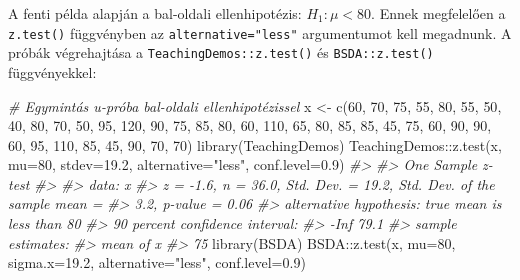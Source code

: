 \documentclass[
]{book}
\newenvironment{Shaded}{\begin{snugshade}}{\end{snugshade}}
\newcommand{\AttributeTok}[1]{\textcolor[rgb]{0.77,0.63,0.00}{#1}}
\newcommand{\CommentTok}[1]{\textcolor[rgb]{0.56,0.35,0.01}{\textit{#1}}}
\newcommand{\DecValTok}[1]{\textcolor[rgb]{0.00,0.00,0.81}{#1}}
\newcommand{\FloatTok}[1]{\textcolor[rgb]{0.00,0.00,0.81}{#1}}
\newcommand{\FunctionTok}[1]{\textcolor[rgb]{0.00,0.00,0.00}{#1}}
\newcommand{\NormalTok}[1]{#1}
\newcommand{\OtherTok}[1]{\textcolor[rgb]{0.56,0.35,0.01}{#1}}
\newcommand{\SpecialCharTok}[1]{\textcolor[rgb]{0.00,0.00,0.00}{#1}}
\newcommand{\StringTok}[1]{\textcolor[rgb]{0.31,0.60,0.02}{#1}}
\begin{document}
A fenti példa alapján a bal-oldali ellenhipotézis: \(H_1:\mu<80\). Ennek megfelelően a \texttt{z.test()} függvényben az \texttt{alternative="less"} argumentumot kell megadnunk. A próbák végrehajtása a \texttt{TeachingDemos::z.test()} és \texttt{BSDA::z.test()} függvényekkel:

\begin{Shaded}
\begin{Highlighting}[]
\CommentTok{\# Egymintás u{-}próba bal{-}oldali ellenhipotézissel}
\NormalTok{x }\OtherTok{\textless{}{-}} \FunctionTok{c}\NormalTok{(}\DecValTok{60}\NormalTok{, }\DecValTok{70}\NormalTok{, }\DecValTok{75}\NormalTok{, }\DecValTok{55}\NormalTok{, }\DecValTok{80}\NormalTok{, }\DecValTok{55}\NormalTok{, }\DecValTok{50}\NormalTok{, }\DecValTok{40}\NormalTok{, }\DecValTok{80}\NormalTok{, }\DecValTok{70}\NormalTok{, }\DecValTok{50}\NormalTok{,}
\DecValTok{95}\NormalTok{, }\DecValTok{120}\NormalTok{, }\DecValTok{90}\NormalTok{, }\DecValTok{75}\NormalTok{, }\DecValTok{85}\NormalTok{, }\DecValTok{80}\NormalTok{, }\DecValTok{60}\NormalTok{, }\DecValTok{110}\NormalTok{, }\DecValTok{65}\NormalTok{, }\DecValTok{80}\NormalTok{, }\DecValTok{85}\NormalTok{, }
\DecValTok{85}\NormalTok{, }\DecValTok{45}\NormalTok{, }\DecValTok{75}\NormalTok{, }\DecValTok{60}\NormalTok{, }\DecValTok{90}\NormalTok{, }\DecValTok{90}\NormalTok{, }\DecValTok{60}\NormalTok{, }\DecValTok{95}\NormalTok{, }\DecValTok{110}\NormalTok{, }\DecValTok{85}\NormalTok{, }\DecValTok{45}\NormalTok{, }
\DecValTok{90}\NormalTok{, }\DecValTok{70}\NormalTok{, }\DecValTok{70}\NormalTok{)}
\FunctionTok{library}\NormalTok{(TeachingDemos)}
\NormalTok{TeachingDemos}\SpecialCharTok{::}\FunctionTok{z.test}\NormalTok{(x, }\AttributeTok{mu=}\DecValTok{80}\NormalTok{, }\AttributeTok{stdev=}\FloatTok{19.2}\NormalTok{, }\AttributeTok{alternative=}\StringTok{"less"}\NormalTok{, }\AttributeTok{conf.level=}\FloatTok{0.9}\NormalTok{)  }
\CommentTok{\#\textgreater{} }
\CommentTok{\#\textgreater{}  One Sample z{-}test}
\CommentTok{\#\textgreater{} }
\CommentTok{\#\textgreater{} data:  x}
\CommentTok{\#\textgreater{} z = {-}1.6, n = 36.0, Std. Dev. = 19.2, Std. Dev. of the sample mean =}
\CommentTok{\#\textgreater{} 3.2, p{-}value = 0.06}
\CommentTok{\#\textgreater{} alternative hypothesis: true mean is less than 80}
\CommentTok{\#\textgreater{} 90 percent confidence interval:}
\CommentTok{\#\textgreater{}  {-}Inf 79.1}
\CommentTok{\#\textgreater{} sample estimates:}
\CommentTok{\#\textgreater{} mean of x }
\CommentTok{\#\textgreater{}        75}
\FunctionTok{library}\NormalTok{(BSDA)}
\NormalTok{BSDA}\SpecialCharTok{::}\FunctionTok{z.test}\NormalTok{(x, }\AttributeTok{mu=}\DecValTok{80}\NormalTok{, }\AttributeTok{sigma.x=}\FloatTok{19.2}\NormalTok{, }\AttributeTok{alternative=}\StringTok{"less"}\NormalTok{, }\AttributeTok{conf.level=}\FloatTok{0.9}\NormalTok{)  }

\end{Highlighting}
\end{Shaded}
\end{document}
